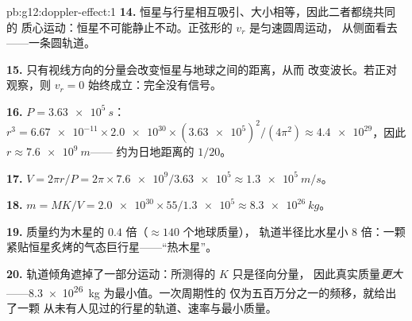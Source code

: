 \begin{solution}{pb:g12:doppler-effect:1}
\textbf{14.} 恒星与行星相互吸引、大小相等，因此二者都绕共同的
质心运动：恒星不可能静止不动。正弦形的 $v_r$ 是匀速圆周运动，
从侧面看去——一条圆轨道。

\textbf{15.} 只有视线方向的分量会改变恒星与地球之间的距离，从而
改变波长。若正对观察，则 $v_r = 0$ 始终成立：完全没有信号。

\textbf{16.} $P = \qty{3.63e5}{s}$：$r^3 = \num{6.67e-11} \times \num{2.0e30} \times
(\num{3.63e5})^2/(4\pi^2) \approx \num{4.4e29}$，因此 $r \approx \qty{7.6e9}{m}$——
约为日地距离的 $1/20$。

\textbf{17.} $V = 2\pi r/P = 2\pi \times \num{7.6e9}/\num{3.63e5} \approx
\qty{1.3e5}{m/s}$。

\textbf{18.} $m = M K/V = \num{2.0e30} \times 55/\num{1.3e5} \approx \qty{8.3e26}{kg}$。

\textbf{19.} 质量约为木星的 $0.4$ 倍（$\approx 140$ 个地球质量），
轨道半径比水星小 $8$ 倍：一颗紧贴恒星炙烤的气态巨行星——“热木星”。

\textbf{20.} 轨道倾角遮掉了一部分运动：所测得的 $K$ 只是径向分量，
因此真实质量\emph{更大}——\qty{8.3e26}{kg} 为最小值。一次周期性的
仅为五百万分之一的频移，就给出了一颗
从未有人见过的行星的轨道、速率与最小质量。
\end{solution}
